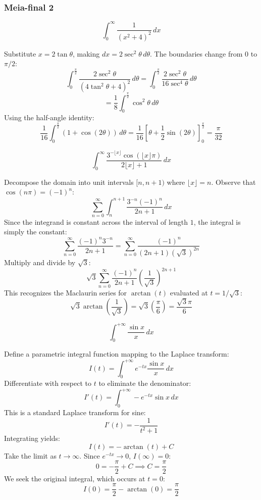 \subsubsection*{Meia-final 2}
\begin{questions}
    \question \[ \int_0^\infty \frac{1}{(x^2 + 4)^2} \,dx \]
    \begin{solution}
        Substitute $x = 2\tan\theta$, making $dx = 2\sec^2\theta \,d\theta$. The boundaries change from $0$ to $\pi/2$:
        \[ \int_0^{\frac{\pi}{2}} \frac{2\sec^2\theta}{(4\tan^2\theta + 4)^2} \,d\theta = \int_0^{\frac{\pi}{2}} \frac{2\sec^2\theta}{16\sec^4\theta} \,d\theta \]
        \[ = \frac{1}{8} \int_0^{\frac{\pi}{2}} \cos^2\theta \,d\theta \]
        Using the half-angle identity:
        \[ \frac{1}{16} \int_0^{\frac{\pi}{2}} (1 + \cos(2\theta)) \,d\theta = \frac{1}{16} \left[ \theta + \frac{1}{2}\sin(2\theta) \right]_0^{\frac{\pi}{2}} = \frac{\pi}{32} \]
    \end{solution}

    \question \[ \int_0^\infty \frac{3^{-\lfloor x \rfloor} \cos(\lfloor x \rfloor \pi)}{2\lfloor x \rfloor + 1} \,dx \]
    \begin{solution}
        Decompose the domain into unit intervals $[n, n+1)$ where $\lfloor x \rfloor = n$. Observe that $\cos(n\pi) = (-1)^n$:
        \[ \sum_{n=0}^\infty \int_n^{n+1} \frac{3^{-n} (-1)^n}{2n + 1} \,dx \]
        Since the integrand is constant across the interval of length $1$, the integral is simply the constant:
        \[ \sum_{n=0}^\infty \frac{(-1)^n 3^{-n}}{2n + 1} = \sum_{n=0}^\infty \frac{(-1)^n}{(2n + 1) (\sqrt{3})^{2n}} \]
        Multiply and divide by $\sqrt{3}$:
        \[ \sqrt{3} \sum_{n=0}^\infty \frac{(-1)^n}{2n + 1} \left(\frac{1}{\sqrt{3}}\right)^{2n+1} \]
        This recognizes the Maclaurin series for $\arctan(t)$ evaluated at $t = 1/\sqrt{3}$:
        \[ \sqrt{3} \arctan\left(\frac{1}{\sqrt{3}}\right) = \sqrt{3} \left( \frac{\pi}{6} \right) = \frac{\sqrt{3}\pi}{6} \]
    \end{solution}

    \question \[ \int_0^{+\infty} \frac{\sin x}{x} \,dx \]
    \begin{solution}
        Define a parametric integral function mapping to the Laplace transform:
        \[ I(t) = \int_0^{+\infty} e^{-tx} \frac{\sin x}{x} \,dx \]
        Differentiate with respect to $t$ to eliminate the denominator:
        \[ I'(t) = \int_0^{+\infty} -e^{-tx} \sin x \,dx \]
        This is a standard Laplace transform for sine:
        \[ I'(t) = -\frac{1}{t^2 + 1} \]
        Integrating yields:
        \[ I(t) = -\arctan(t) + C \]
        Take the limit as $t \to \infty$. Since $e^{-tx} \to 0$, $I(\infty) = 0$:
        \[ 0 = -\frac{\pi}{2} + C \implies C = \frac{\pi}{2} \]
        We seek the original integral, which occurs at $t = 0$:
        \[ I(0) = \frac{\pi}{2} - \arctan(0) = \frac{\pi}{2} \]
    \end{solution}


\end{questions}
